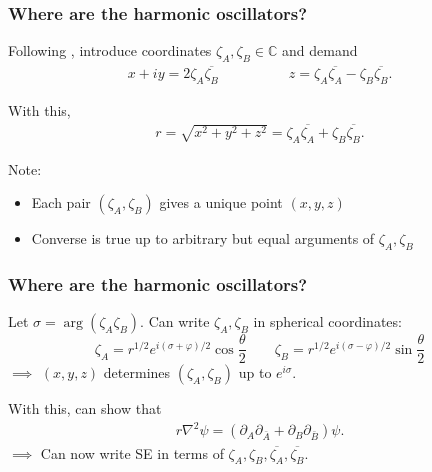 \documentclass{beamer}
\theoremstyle{definition}
\newcommand{\p}{\partial}
\newcommand{\f}[2]{\frac{#1}{#2}}
\begin{document}
\begin{frame}
	\frametitle{Where are the harmonic oscillators? }
	
	Following \cite{cornish1984hydrogen}, introduce coordinates $\zeta_A, \zeta_B \in \mathbb{C}$ and demand
	\begin{align*}
	x + iy = 2 \zeta_A  \overline{\zeta_B} 
	\quad\quad\quad\quad\quad   
	z = \zeta_A \overline{\zeta_A}  -  \zeta_B \overline{\zeta_B}  .
	\end{align*}
	
	With this,
	\begin{align*}
	r = \sqrt{x^2 + y^2 + z^2} = \zeta_A \overline{\zeta_A}  +  \zeta_B \overline{\zeta_B} .
	\end{align*}
	
	Note:
	\begin{itemize}
	\item Each pair $(\zeta_A, \zeta_B)$ gives a unique point $(x,y,z)$
	
	\item Converse is true up to arbitrary but equal arguments of $\zeta_A, \zeta_B$
	\end{itemize}
	
\end{frame}


\begin{frame}
	\frametitle{Where are the harmonic oscillators? }
	
	Let $\sigma = \arg(\zeta_A \zeta_B)$. Can write $\zeta_A, \zeta_B$ in spherical coordinates:
	\begin{equation}\label{eq:coords}
	\zeta_A = r^{1/2} e^{i (\sigma + \varphi)/2}   \cos  \f{\theta}{2}  
	\quad\quad 
	\zeta_B = r^{1/2} e^{i(\sigma - \varphi)/2}  \sin \f{\theta}{2} 
	\end{equation}
	$\implies$ $(x,y,z)$ determines $(\zeta_A, \zeta_B)$ up to $e^{i\sigma}$.
	
	
	\vspace{15pt}
	
	
	With this, can show that
	\begin{align*}
	r \nabla^2 \psi = (\p_A \p_{\bar{A}} + \p_B \p_{\bar{B}}) \psi.
	\end{align*}
	$\implies$ Can now write SE in terms of $\zeta_A, \zeta_B, \overline{\zeta_A}, \overline{\zeta_B}$. 
	
	

\end{frame}
\end{document}

